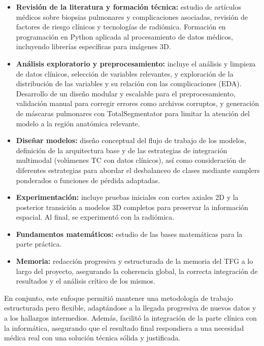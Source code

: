 \begin{itemize}
    \item \textbf{Revisión de la literatura y formación técnica:} estudio de artículos médicos sobre biopsias pulmonares y complicaciones asociadas, revisión de factores de riesgo clínicos y tecnologías de radiómica. Formación en programación en Python aplicada al procesamiento de datos médicos, incluyendo librerías específicas para imágenes 3D.

    \item \textbf{Análisis exploratorio y preprocesamiento:} incluye el análisis y limpieza de datos clínicos, selección de variables relevantes, y exploración de la distribución de las variables y su relación con las complicaciones (EDA). Desarrollo de un diseño modular y escalable para el preprocesamiento, validación manual para corregir errores como archivos corruptos, y generación de máscaras pulmonares con TotalSegmentator para limitar la atención del modelo a la región anatómica relevante.

    \item \textbf{Diseñar modelos:} diseño conceptual del flujo de trabajo de los modelos, definición de la arquitectura base y de las estrategias de integración multimodal (volúmenes TC con datos clínicos), así como consideración de diferentes estrategias para abordar el desbalanceo de clases mediante samplers ponderados o funciones de pérdida adaptadas.

    \item \textbf{Experimentación:} incluye pruebas iniciales con cortes axiales 2D y la posterior transición a modelos 3D completos para preservar la información espacial. Al final, se experimentó con la radiómica. 

    \item \textbf{Fundamentos matemáticos:} estudio de las bases matemáticas para la parte práctica. 

    \item \textbf{Memoria:} redacción progresiva y estructurada de la memoria del TFG a lo largo del proyecto, asegurando la coherencia global, la correcta integración de resultados y el análisis crítico de los mismos.
\end{itemize}


En conjunto, este enfoque permitió mantener una metodología de trabajo estructurada pero flexible, adaptándose a la llegada progresiva de nuevos datos y a los hallazgos intermedios. Además, facilitó la integración de la parte clínica con la informática, asegurando que el resultado final respondiera a una necesidad médica real con una solución técnica sólida y justificada.


